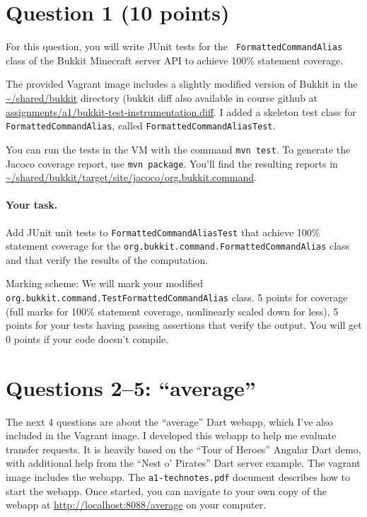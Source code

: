 \documentclass[10pt,hidelinks]{article}
\begin{document}
\newpage

\section*{Question 1 (10 points)}
For this question, you will write JUnit tests for the {\tt
  FormattedCommandAlias} class of the Bukkit Minecraft server API to
achieve 100\% statement coverage.

The provided Vagrant image includes a slightly modified version of
Bukkit in the \url{~/shared/bukkit} directory (bukkit diff also available in course
github at \url{assignments/a1/bukkit-test-instrumentation.diff}.  
I added a skeleton test class for {\tt
  FormattedCommandAlias}, called {\tt FormattedCommandAliasTest}.

You can run the tests in the VM with the command {\tt mvn test}.  To
generate the Jacoco coverage report, use {\tt mvn package}. You'll
find the resulting reports in
\url{~/shared/bukkit/target/site/jacoco/org.bukkit.command}.

\paragraph{Your task.} Add JUnit unit tests to {\tt FormattedCommandAliasTest}
that achieve 100\% statement 
coverage for the {\tt org.bukkit.command.FormattedCommandAlias} class
and that verify the results of the computation.

Marking scheme: We will mark your modified {\tt
  org.bukkit.command.TestFormattedCommandAlias} class.  5 points for
coverage (full marks for 100\% statement coverage, nonlinearly scaled
down for less), 5 points for your tests having passing assertions that
verify the output. You will get 0 points if your code doesn't compile.

\section*{Questions 2--5: ``average''}
The next 4 questions are about the ``average'' Dart webapp, which I've
also included in the Vagrant image. I developed this webapp to help me
evaluate transfer requests. It is heavily based on the ``Tour of
Heroes'' Angular Dart demo, with additional help from the ``Nest o' Pirates'' 
Dart server example. The vagrant image includes
the webapp. The {\tt a1-technotes.pdf} document describes how to start
the webapp. Once started, you can navigate to your own copy of the
webapp at \url{http://localhost:8088/average} on your computer.
\end{document}
